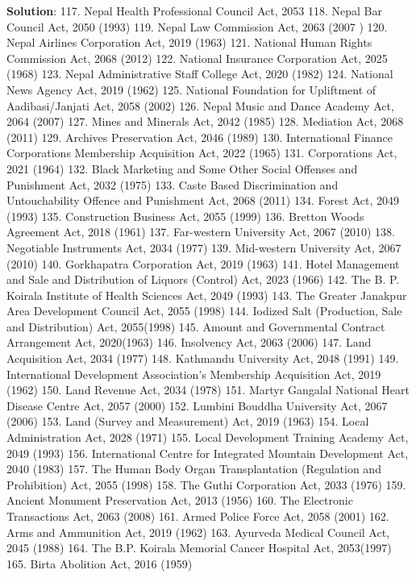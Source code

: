 \documentclass[
]{book}
\newenvironment{solution}{ {\bfseries Solution}:}{}
\begin{document}
\begin{questions}
\begin{solution}
117. Nepal Health Professional Council Act, 2053
118. Nepal Bar Council Act, 2050 (1993)
119. Nepal Law Commission Act, 2063 (2007 )
120. Nepal Airlines Corporation Act, 2019 (1963)
121. National Human Rights Commission Act, 2068 (2012)
122. National Insurance Corporation Act, 2025 (1968)
123. Nepal Administrative Staff College Act, 2020 (1982)
124. National News Agency Act, 2019 (1962)
125. National Foundation for Upliftment of Aadibasi/Janjati Act, 2058 (2002)
126. Nepal Music and Dance Academy Act, 2064 (2007)
127. Mines and Minerals Act, 2042 (1985)
128. Mediation Act, 2068 (2011)
129. Archives Preservation Act, 2046 (1989)
130. International Finance Corporations Membership Acquisition Act, 2022 (1965)
131. Corporations Act, 2021 (1964)
132. Black Marketing and Some Other Social Offenses and Punishment Act, 2032 (1975)
133. Caste Based Discrimination and Untouchability Offence and Punishment Act, 2068 (2011)
134. Forest Act, 2049 (1993)
135. Construction Business Act, 2055 (1999)
136. Bretton Woods Agreement Act, 2018 (1961)
137. Far-western University Act, 2067 (2010)
138. Negotiable Instruments Act, 2034 (1977)
139. Mid-western University Act, 2067 (2010)
140. Gorkhapatra Corporation Act, 2019 (1963)
141. Hotel Management and Sale and Distribution of Liquors (Control) Act, 2023 (1966)
142. The B. P. Koirala Institute of Health Sciences Act, 2049 (1993)
143. The Greater Janakpur Area Development Council Act, 2055 (1998)
144. Iodized Salt (Production, Sale and Distribution) Act, 2055(1998)
145. Amount and Governmental Contract Arrangement Act, 2020(1963)
146. Insolvency Act, 2063 (2006)
147. Land Acquisition Act, 2034 (1977)
148. Kathmandu University Act, 2048 (1991)
149. International Development Association’s Membership Acquisition Act, 2019 (1962)
150. Land Revenue Act, 2034 (1978)
151. Martyr Gangalal National Heart Disease Centre Act, 2057 (2000)
152. Lumbini Bouddha University Act, 2067 (2006)
153. Land (Survey and Measurement) Act, 2019 (1963)
154. Local Administration Act, 2028 (1971)
155. Local Development Training Academy Act, 2049 (1993)
156. International Centre for Integrated Mountain Development Act, 2040 (1983)
157. The Human Body Organ Transplantation (Regulation and Prohibition) Act, 2055 (1998)
158. The Guthi Corporation Act, 2033 (1976)
159. Ancient Monument Preservation Act, 2013 (1956)
160. The Electronic Transactions Act, 2063 (2008)
161. Armed Police Force Act, 2058 (2001)
162. Arms and Ammunition Act, 2019 (1962)
163. Ayurveda Medical Council Act, 2045 (1988)
164. The B.P. Koirala Memorial Cancer Hospital Act, 2053(1997)
165. Birta Abolition Act, 2016 (1959)

\end{solution}
\end{questions}
\end{document}

